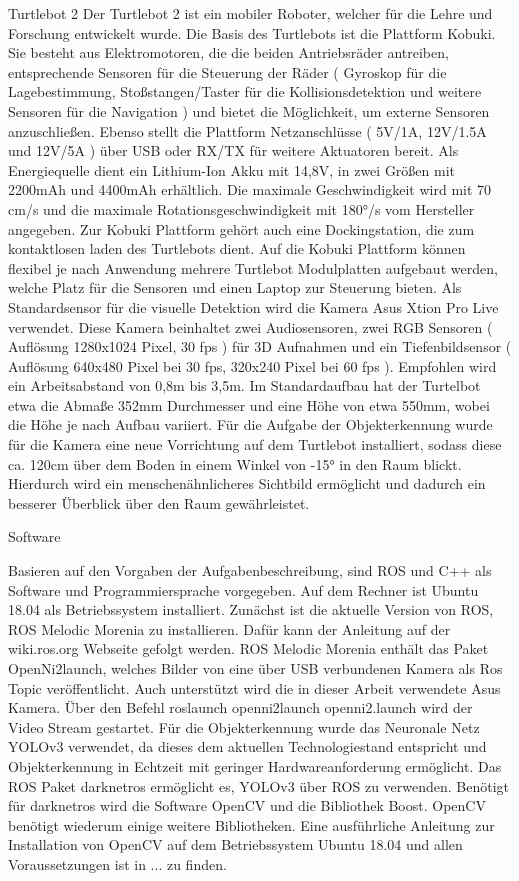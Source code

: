 Turtlebot 2
Der Turtlebot 2 ist ein mobiler Roboter, welcher für die Lehre und Forschung entwickelt wurde. Die Basis des Turtlebots ist die Plattform Kobuki. Sie besteht aus Elektromotoren, die die beiden Antriebsräder antreiben, entsprechende Sensoren für die Steuerung der Räder ( Gyroskop für die Lagebestimmung, Stoßstangen/Taster für die Kollisionsdetektion und weitere Sensoren für die Navigation )  und bietet die Möglichkeit, um externe Sensoren anzuschließen. Ebenso stellt die Plattform Netzanschlüsse ( 5V/1A, 12V/1.5A und 12V/5A ) über USB oder RX/TX für weitere Aktuatoren bereit. Als Energiequelle dient ein Lithium-Ion Akku mit 14,8V, in zwei Größen mit 2200mAh und 4400mAh erhältlich. Die maximale Geschwindigkeit wird mit 70 cm/s und die maximale Rotationsgeschwindigkeit mit 180°/s vom Hersteller angegeben. Zur Kobuki Plattform gehört auch eine Dockingstation, die zum kontaktlosen laden des Turtlebots dient.
Auf die Kobuki Plattform können flexibel je nach Anwendung mehrere Turtlebot Modulplatten aufgebaut werden, welche Platz für die Sensoren und einen Laptop zur Steuerung bieten. Als Standardsensor für die visuelle Detektion wird die Kamera Asus Xtion Pro Live verwendet. Diese Kamera beinhaltet zwei Audiosensoren, zwei RGB Sensoren ( Auflösung 1280x1024 Pixel, 30 fps ) für 3D Aufnahmen und ein Tiefenbildsensor ( Auflösung 640x480 Pixel bei 30 fps, 320x240 Pixel bei 60 fps ). Empfohlen wird ein Arbeitsabstand von 0,8m bis 3,5m.
Im Standardaufbau hat der Turtelbot etwa die Abmaße 352mm Durchmesser und eine Höhe von etwa 550mm, wobei die Höhe je nach Aufbau variiert.
Für die Aufgabe der Objekterkennung wurde für die Kamera eine neue Vorrichtung auf dem Turtlebot installiert, sodass diese ca. 120cm über dem Boden in einem Winkel von -15° in den Raum blickt. Hierdurch wird ein menschenähnlicheres Sichtbild ermöglicht und dadurch ein besserer Überblick über den Raum gewährleistet. 




Software

Basieren auf den Vorgaben der Aufgabenbeschreibung, sind ROS und C++ als Software und Programmiersprache vorgegeben. Auf dem Rechner ist Ubuntu 18.04 als Betriebssystem installiert. Zunächst ist die aktuelle Version von ROS, ROS Melodic Morenia zu installieren. Dafür kann der Anleitung auf der wiki.ros.org Webseite gefolgt werden. 
ROS Melodic Morenia enthält das Paket OpenNi2launch, welches Bilder von eine über USB verbundenen Kamera als Ros Topic veröffentlicht. Auch unterstützt wird die in dieser Arbeit verwendete Asus Kamera. Über den Befehl roslaunch openni2launch openni2.launch wird der Video Stream gestartet.
Für die Objekterkennung wurde das Neuronale Netz YOLOv3 verwendet, da dieses dem aktuellen Technologiestand entspricht und Objekterkennung in Echtzeit mit geringer Hardwareanforderung ermöglicht. Das ROS Paket darknetros ermöglicht es, YOLOv3 über ROS zu verwenden. Benötigt für darknetros wird die Software OpenCV und die Bibliothek Boost. OpenCV benötigt wiederum einige weitere Bibliotheken. Eine ausführliche Anleitung zur Installation von OpenCV auf dem Betriebssystem Ubuntu 18.04 und allen Voraussetzungen ist in ... zu finden.

